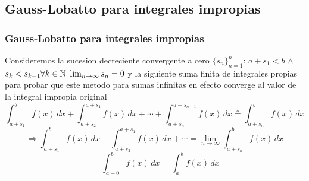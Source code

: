 \documentclass{beamer}
\begin{document}
\subsection{Gauss-Lobatto para integrales impropias}
\begin{frame}
\frametitle{Gauss-Lobatto para integrales impropias}
Consideremos la sucesion decreciente convergente a cero $\{s_n\}_{n=1}^n$: $a+s_1<b$ $\wedge$ \stackrel{*} $s_k < s_{k-1} \space \forall k\in \mathbb{N}$ \wedge $\space\lim_{n \rightarrow \infty} s_n = 0$
y la siguiente suma finita de integrales propias para probar que este metodo para sumas infinitas en efecto converge al valor de
la integral impropia original
$$
\int_{a + s_1}^b f(x) \, dx + \int_{a + s_{2}}^{a + s_1} f(x) \, dx + \cdots + \int_{a + s_n}^{a + s_{n-1}} f(x) \, dx \stackrel{*}= \int_{a+s_n}^b f(x) \, dx \quad $$
$$\Rightarrow \int_{a + s_1}^b f(x) \, dx + \int_{a + s_2}^{a + s_1} f(x) \, dx + \cdots = \lim_{n \rightarrow \infty} \int_{a + s_n}^b f(x) \, dx $$$$ =\int_{a + 0}^b f(x) \, dx = \int_a^b f(x) \, dx$$
\\~\\
\end{frame}

\end{document}
